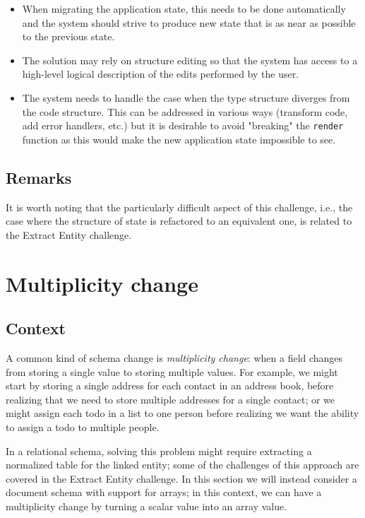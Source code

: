 \documentclass[english,submission]{programming}
\begin{document}
\begin{itemize}
\item When migrating the application state, this needs to be done automatically and the system should strive to produce new state that is as near as possible to the previous state.
\item The solution may rely on structure editing so that the system has access to a high-level logical description of the edits performed by the user.
\item The system needs to handle the case when the type structure diverges from the code structure. This can be addressed in various ways (transform code, add error handlers, etc.) but it is desirable to avoid "breaking" the \texttt{render} function as this would make the new application state impossible to see.
\end{itemize}

\subsection{Remarks}
It is worth noting that the particularly difficult aspect of this challenge, i.e., the case where the structure of state is refactored to an equivalent one, is related to the Extract Entity challenge.

\section{Multiplicity change}

\subsection{Context}

A common kind of schema change is \textit{multiplicity change}: when a field changes from storing a single value to storing multiple values. For example, we might start by storing a single address for each contact in an address book, before realizing that we need to store multiple addresses for a single contact; or we might assign each todo in a list to one person before realizing we want the ability to assign a todo to multiple people.

In a relational schema, solving this problem might require extracting a normalized table for the linked entity; some of the challenges of this approach are covered in the Extract Entity challenge. In this section we will instead consider a document schema with support for arrays; in this context, we can have a multiplicity change by turning a scalar value into an array value.
\end{document}
